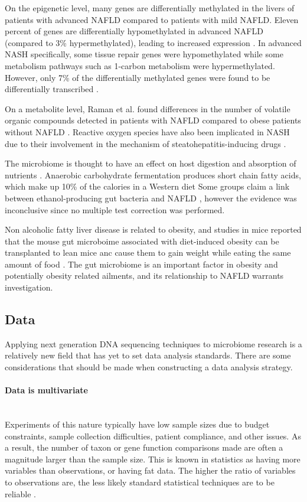 On the epigenetic level, many genes are differentially methylated in the livers of patients with advanced NAFLD compared to patients with mild NAFLD. Eleven percent of genes are differentially hypomethylated in advanced NAFLD (compared to 3\% hypermethylated), leading to increased expression \cite{murphy2013relationship}. In advanced NASH specifically, some tissue repair genes were hypomethylated while some metabolism pathways such as 1-carbon metabolism were hypermethylated. However, only 7\% of the differentially methylated genes were found to be differentially transcribed \cite{murphy2013relationship}.

On a metabolite level, Raman et al. found differences in the number of volatile organic compounds detected in patients with NAFLD compared to obese patients without NAFLD \cite{raman2013fecal}. Reactive oxygen species have also been implicated in NASH due to their involvement in the mechanism of steatohepatitis-inducing drugs \cite{berson1998steatohepatitis}.

The microbiome is thought to have an effect on host digestion and absorption of nutrients \cite{gill2006metagenomic}. Anaerobic carbohydrate fermentation produces short chain fatty acids, which make up 10\% of the calories in a Western diet \cite{mcneil1984contribution} Some groups claim a link between ethanol-producing gut bacteria and NAFLD \cite{zhu2013characterization} \cite{jiang2015dysbiosis}, however the evidence was inconclusive since no multiple test correction was performed.

Non alcoholic fatty liver disease is related to obesity, and studies in mice reported that the mouse gut microboime associated with diet-induced obesity can be transplanted to lean mice anc cause them to gain weight while eating the same amount of food \cite{turnbaugh2008diet}. The gut microbiome is an important factor in obesity and potentially obesity related ailments, and its relationship to NAFLD warrants investigation.

\subsection{Data}
Applying next generation DNA sequencing techniques to microbiome research is a relatively new field that has yet to set data analysis standards. There are some considerations that should be made when constructing a data analysis strategy.

\paragraph{Data is multivariate}\mbox{}\\
Experiments of this nature typically have low sample sizes due to budget constraints, sample collection difficulties, patient compliance, and other issues. As a result, the number of taxon or gene function comparisons made are often a magnitude larger than the sample size. This is known in statistics as having more variables than observations, or having fat data. The higher the ratio of variables to observations are, the less likely standard statistical techniques are to be reliable \cite{osborne2004sample}.

